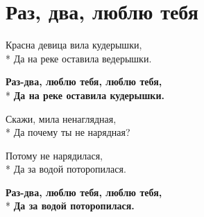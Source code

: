 \vspace{\fill}\newpage

\section{Раз, два, люблю тебя}
\label{song:Раз,_два,_люблю_тебя}

\medskip

\begin{minipage}{\linewidth}
Красна девица вила кудерышки,\\*
Да на реке оставила ведерышки.\\
\end{minipage}\par\medskip\nobreak

\medskip

\begin{minipage}{\linewidth}
\hspace*{1.5em}\textbf{Раз-два, люблю тебя, люблю тебя,}\\*
\hspace*{1.5em}\textbf{Да на реке оставила кудерышки.}\\
\end{minipage}\par\medskip\nobreak

\medskip

\begin{minipage}{\linewidth}
Скажи, мила ненаглядная,\\*
Да почему ты не нарядная?\\
\end{minipage}\par\medskip\nobreak

\medskip

\begin{minipage}{\linewidth}
Потому не нарядилася,\\*
Да за водой поторопилася.\\
\end{minipage}\par\medskip\nobreak

\medskip

\begin{minipage}{\linewidth}
\hspace*{1.5em}\textbf{Раз-два, люблю тебя, люблю тебя,}\\*
\hspace*{1.5em}\textbf{Да за водой поторопилася.}\\
\end{minipage}\par\medskip\nobreak


